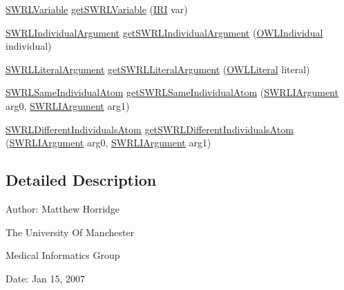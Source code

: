 \begin{DoxyCompactItemize}
\item 
\hyperlink{interfaceorg_1_1semanticweb_1_1owlapi_1_1model_1_1_s_w_r_l_variable}{S\-W\-R\-L\-Variable} \hyperlink{interfaceorg_1_1semanticweb_1_1owlapi_1_1model_1_1_s_w_r_l_data_factory_acf0c35b339291804b2d979285e58d10b}{get\-S\-W\-R\-L\-Variable} (\hyperlink{classorg_1_1semanticweb_1_1owlapi_1_1model_1_1_i_r_i}{I\-R\-I} var)
\item 
\hyperlink{interfaceorg_1_1semanticweb_1_1owlapi_1_1model_1_1_s_w_r_l_individual_argument}{S\-W\-R\-L\-Individual\-Argument} \hyperlink{interfaceorg_1_1semanticweb_1_1owlapi_1_1model_1_1_s_w_r_l_data_factory_ae0ca82d1ad2d0a09cba7f26c14c15078}{get\-S\-W\-R\-L\-Individual\-Argument} (\hyperlink{interfaceorg_1_1semanticweb_1_1owlapi_1_1model_1_1_o_w_l_individual}{O\-W\-L\-Individual} individual)
\item 
\hyperlink{interfaceorg_1_1semanticweb_1_1owlapi_1_1model_1_1_s_w_r_l_literal_argument}{S\-W\-R\-L\-Literal\-Argument} \hyperlink{interfaceorg_1_1semanticweb_1_1owlapi_1_1model_1_1_s_w_r_l_data_factory_a8857622fef8d45281c009cf12988cd4d}{get\-S\-W\-R\-L\-Literal\-Argument} (\hyperlink{interfaceorg_1_1semanticweb_1_1owlapi_1_1model_1_1_o_w_l_literal}{O\-W\-L\-Literal} literal)
\item 
\hyperlink{interfaceorg_1_1semanticweb_1_1owlapi_1_1model_1_1_s_w_r_l_same_individual_atom}{S\-W\-R\-L\-Same\-Individual\-Atom} \hyperlink{interfaceorg_1_1semanticweb_1_1owlapi_1_1model_1_1_s_w_r_l_data_factory_a551e0b3505785584471e7d419f05c3a5}{get\-S\-W\-R\-L\-Same\-Individual\-Atom} (\hyperlink{interfaceorg_1_1semanticweb_1_1owlapi_1_1model_1_1_s_w_r_l_i_argument}{S\-W\-R\-L\-I\-Argument} arg0, \hyperlink{interfaceorg_1_1semanticweb_1_1owlapi_1_1model_1_1_s_w_r_l_i_argument}{S\-W\-R\-L\-I\-Argument} arg1)
\item 
\hyperlink{interfaceorg_1_1semanticweb_1_1owlapi_1_1model_1_1_s_w_r_l_different_individuals_atom}{S\-W\-R\-L\-Different\-Individuals\-Atom} \hyperlink{interfaceorg_1_1semanticweb_1_1owlapi_1_1model_1_1_s_w_r_l_data_factory_adaea90ea187f94b46cf4fe8ab5f52643}{get\-S\-W\-R\-L\-Different\-Individuals\-Atom} (\hyperlink{interfaceorg_1_1semanticweb_1_1owlapi_1_1model_1_1_s_w_r_l_i_argument}{S\-W\-R\-L\-I\-Argument} arg0, \hyperlink{interfaceorg_1_1semanticweb_1_1owlapi_1_1model_1_1_s_w_r_l_i_argument}{S\-W\-R\-L\-I\-Argument} arg1)
\end{DoxyCompactItemize}


\subsection{Detailed Description}
Author\-: Matthew Horridge\par
 The University Of Manchester\par
 Medical Informatics Group\par
 Date\-: Jan 15, 2007\par
\par
 

